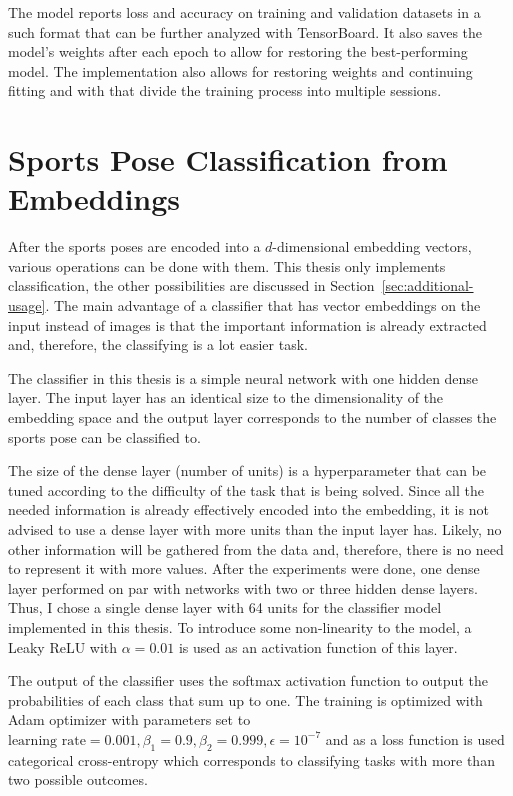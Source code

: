 The model reports loss and accuracy on training and validation datasets in a such format that can be further analyzed with TensorBoard. It also saves the model's weights after each epoch to allow for restoring the best-performing model. The implementation also allows for restoring weights and continuing fitting and with that divide the training process into multiple sessions.

\section{\label{sec:classifier}Sports Pose Classification from Embeddings}

After the sports poses are encoded into a $d$-dimensional embedding vectors, various operations can be done with them. This thesis only implements classification, the other possibilities are discussed in Section~\ref{sec:additional-usage}. The main advantage of a classifier that has vector embeddings on the input instead of images is that the important information is already extracted and, therefore, the classifying is a lot easier task.

The classifier in this thesis is a simple neural network with one hidden dense layer. The input layer has an identical size to the dimensionality of the embedding space and the output layer corresponds to the number of classes the sports pose can be classified to.

The size of the dense layer (number of units) is a hyperparameter that can be tuned according to the difficulty of the task that is being solved. Since all the needed information is already effectively encoded into the embedding, it is not advised to use a dense layer with more units than the input layer has. Likely, no other information will be gathered from the data and, therefore, there is no need to represent it with more values. After the experiments were done, one dense layer performed on par with networks with two or three hidden dense layers. Thus, I chose a single dense layer with 64 units for the classifier model implemented in this thesis. To introduce some non-linearity to the model, a Leaky ReLU with $\alpha = 0.01$ is used as an activation function of this layer.

The output of the classifier uses the softmax activation function to output the probabilities of each class that sum up to one. The training is optimized with Adam optimizer with parameters set to $\text{learning rate} = 0.001, \beta_1 = 0.9, \beta_2 = 0.999, \epsilon = 10^{-7}$ and as a loss function is used categorical cross-entropy which corresponds to classifying tasks with more than two possible outcomes.

